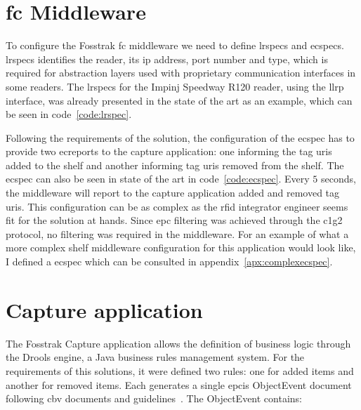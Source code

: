 \section{\acs{fc} Middleware}

To configure the Fosstrak \ac{fc} middleware we need to define \acp{lrspec} and \acp{ecspec}.
\acp{lrspec} identifies the reader, its \ac{ip} address, port number and type, which is required for abstraction layers used with proprietary communication interfaces in some readers.
The \acp{lrspec} for the Impinj Speedway R120 reader, using the \ac{llrp} interface, was already presented in the state of the art as an example, which can be seen in code~\ref{code:lrspec}.

Following the requirements of the solution, the configuration of the \ac{ecspec} has to provide two \acp{ecreport} to the capture application: one informing the tag \acp{uri} added to the shelf and another informing tag \acp{uri} removed from the shelf.
The \ac{ecspec} can also be seen in state of the art in code~\ref{code:ecspec}.
Every $5$ seconds, the middleware will report to the capture application added and removed tag \acp{uri}.
This configuration can be as complex as the \ac{rfid} integrator engineer seems fit for the solution at hands. Since \ac{epc} filtering was achieved through the \ac{c1g2} protocol, no filtering was required in the middleware. For an example of what a more complex shelf middleware configuration for this application would look like, I defined a \ac{ecspec} which can be consulted in appendix~\ref{apx:complexecspec}.

\section{Capture application}

The Fosstrak Capture application allows the definition of business logic through the Drools engine, a Java business rules management system.
For the requirements of this solutions, it were defined two rules: one for added items and another for removed items. Each generates a single \ac{epcis} ObjectEvent document following \ac{cbv} documents and guidelines~\cite{CoreBusinessVocabulary}. The ObjectEvent contains:


